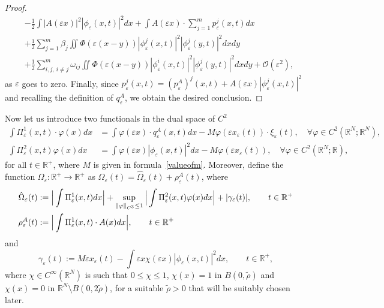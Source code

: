 \documentclass[11pt]{amsart}
\numberwithin{equation}{section}
\theoremstyle{definition}
\begin{document}
\begin{proof}
\begin{align*}
& -\frac{1}{2}\int |A({\varepsilon} x)|^2|\phi_{\varepsilon}(x,t)|^2dx+\int A({\varepsilon}
x)\cdot \sum_{j=1}^m p_{\varepsilon}^j(x,t)dx \\
& +\frac{1}{2}\sum_{j=1}^m\beta_j \iint \Phi({\varepsilon} (x-y))|\phi_{\varepsilon}^j(x,t)|^2|\phi^j_{\varepsilon}(y,t)|^2 dx dy \\
& +\frac{1}{2}\sum_{i,j,\,i\neq j}^m\omega_{ij} \iint
\Phi({\varepsilon}(x-y))|\phi_{\varepsilon}^i(x,t)|^2|\phi^j_{\varepsilon}(y,t)|^2 dx dy+{\mathcal O}({\varepsilon}^2),
\end{align*}
as ${\varepsilon}$ goes to zero. Finally, since
$p_{\varepsilon}^j(x,t)=(p_{\varepsilon}^A)^j(x,t)+A({\varepsilon} x)|\phi_{\varepsilon}^j(x,t)|^2$
and recalling the definition of $q_{\varepsilon}^A$, we obtain the desired
conclusion.
\end{proof}

\vskip3pt
\noindent
Now let us introduce two functionals in the dual space of $C^2$
\begin{align}
     \int \Pi^1_{\varepsilon}(x,t) \cdot\varphi(x) dx &=
    \int \varphi({\varepsilon} x)\cdot q^A_{\varepsilon}(x,t)dx-M\varphi({\varepsilon} x_{\varepsilon}(t))\cdot\xi_{\varepsilon}(t), \quad \forall\varphi\in
C^2({{\mathbb R}}^N;{{\mathbb R}}^N),\label{pigreco1}\\
 \int \Pi^2_{\varepsilon}(x,t)\varphi(x) dx & =\int \varphi({\varepsilon}
x)|\phi_{\varepsilon}(x,t)|^2dx-M\varphi({\varepsilon} x_{\varepsilon}(t)),  \quad \forall
\varphi\in C^2({{\mathbb R}}^N;{{\mathbb R}}),\label{pigreco2}
\end{align}
for all $t\in{{\mathbb R}}^+$, where $M$ is given in formula~\eqref{valueofm}.
Moreover, define the function $\Omega_{\varepsilon}:{{\mathbb R}}^+\to{{\mathbb R}}^+$ as $\Omega_{\varepsilon}(t)=\hat\Omega_{\varepsilon}(t)+\rho_{\varepsilon}^A(t)$, where
\begin{align}
\label{defOmega} \hat\Omega_{\varepsilon}(t)&:=\Big|\int
\Pi^1_{\varepsilon}(x,t)dx\Big|+\sup_{\|\varphi\|_{C^3}\leq 1} \Big|\int
\Pi^2_{\varepsilon}(x,t)\varphi(x)dx\Big|+|\gamma_{\varepsilon}(t)|, \qquad t\in{{\mathbb R}}^+ \\
\rho_{\varepsilon}^A(t) &:=\Big|\int \Pi_{\varepsilon}^1(x,t)\cdot A(x)dx\Big|,\qquad t\in{{\mathbb R}}^+  \notag
\end{align}
and
$$
\gamma_{\varepsilon}(t):=M{\varepsilon} x_{\varepsilon}(t)- \int
{\varepsilon} x\chi({\varepsilon} x)|\phi_{\varepsilon}(x,t)|^{2}dx, \qquad t\in{{\mathbb R}}^+,
$$
where $\chi\in C^\infty({{\mathbb R}}^N)$ is such that $0\leq \chi\leq 1$,
$\chi(x)=1$ in $B(0, \tilde \rho)$ and
$\chi(x)=0$ in ${{\mathbb R}}^N \setminus B(0, 2\tilde\rho)$,
for a suitable $\tilde\rho>0$ that will be suitably
chosen later.
\vskip3pt
\end{document}
